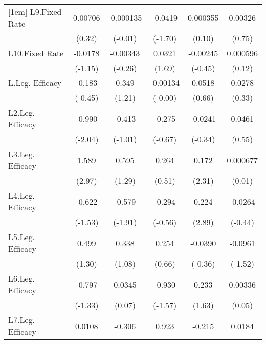 {\begin{longtable}{l*{5}{c}}
[1em]
L9.Fixed Rate   &  0.00706         &-0.000135         &  -0.0419         & 0.000355         &  0.00326         \\
                &   (0.32)         &  (-0.01)         &  (-1.70)         &   (0.10)         &   (0.75)         \\
[1em]
L10.Fixed Rate  &  -0.0178         & -0.00343         &   0.0321         & -0.00245         & 0.000596         \\
                &  (-1.15)         &  (-0.26)         &   (1.69)         &  (-0.45)         &   (0.12)         \\
[1em]
L.Leg. Efficacy &   -0.183         &    0.349         & -0.00134         &   0.0518         &   0.0278         \\
                &  (-0.45)         &   (1.21)         &  (-0.00)         &   (0.66)         &   (0.33)         \\
[1em]
L2.Leg. Efficacy&   -0.990\sym{*}  &   -0.413         &   -0.275         &  -0.0241         &   0.0461         \\
                &  (-2.04)         &  (-1.01)         &  (-0.67)         &  (-0.34)         &   (0.55)         \\
[1em]
L3.Leg. Efficacy&    1.589\sym{**} &    0.595         &    0.264         &    0.172\sym{*}  & 0.000677         \\
                &   (2.97)         &   (1.29)         &   (0.51)         &   (2.31)         &   (0.01)         \\
[1em]
L4.Leg. Efficacy&   -0.622         &   -0.579         &   -0.294         &    0.224\sym{**} &  -0.0264         \\
                &  (-1.53)         &  (-1.91)         &  (-0.56)         &   (2.89)         &  (-0.44)         \\
[1em]
L5.Leg. Efficacy&    0.499         &    0.338         &    0.254         &  -0.0390         &  -0.0961         \\
                &   (1.30)         &   (1.08)         &   (0.66)         &  (-0.36)         &  (-1.52)         \\
[1em]
L6.Leg. Efficacy&   -0.797         &   0.0345         &   -0.930         &    0.233         &  0.00336         \\
                &  (-1.33)         &   (0.07)         &  (-1.57)         &   (1.63)         &   (0.05)         \\
[1em]
L7.Leg. Efficacy&   0.0108         &   -0.306         &    0.923         &   -0.215         &   0.0184         \\

\end{longtable}}
